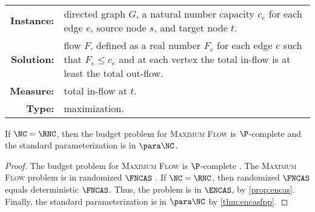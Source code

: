 \begin{definition}
  \mbox{} \\
  \begin{tabular}{r p{9.2cm}}
    \textbf{Instance:} & directed graph $G$, a natural number capacity $c_e$ for each edge $e$, source node $s$, and target node $t$. \\
    \textbf{Solution:} & flow $F$, defined as a real number $F_e$ for each edge $e$ such that $F_e \leq c_e$ and at each vertex the total in-flow is at least the total out-flow. \\
    \textbf{Measure:} & total in-flow at $t$. \\
    \textbf{Type:} & maximization.
  \end{tabular}
\end{definition}


\begin{theorem}\label{thm:maxflow}
  If $\NC = \RNC$, then the budget problem for \textsc{Maximum Flow} is $\P$-complete and the standard parameterization is in $\para \NC$.
\end{theorem}
\begin{proof}
  The budget problem for \textsc{Maximum Flow} is $\P$-complete \autocite[Problem~A.4.4]{ghr95}.
  The \textsc{Maximum Flow} problem is in randomized $\FNCAS$ \autocite[Theorem~4.5.2]{dsst97}.
  If $\NC = \RNC$, then randomized $\FNCAS$ equals deterministic $\FNCAS$.
  Thus, the problem is in $\ENCAS$, by \autoref{prop:encas}.
  Finally, the standard parameterization is in $\para \NC$ by \autoref{thm:encasfpp}.
\end{proof}


